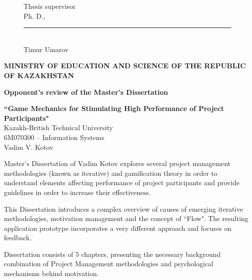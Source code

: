 \begin{titlepage}
        \begin{figure}[ht]
            \begin{minipage}[t]{0.5\linewidth}
                Thesis supervisor\\
                Ph. D.,

                \rule{13em}{0.4pt}\\
                Timur Umarov\\
            \end{minipage}
        \end{figure}
        
        \pagebreak

    \begin{centering}
        {\bf{\MakeUppercase{Ministry of education and science of the republic of Kazakhstan}}}

       \vspace{14pt}

        {\bf
        Opponent's review of the Master's Dissertation\\
        }

        \vspace{14pt}
        
        {\bf``Game Mechanics for Stimulating High Performance of Project Participants"}\\
        {\small Kazakh-British Technical University\\
        6M070300 -- Information Systems\\
        Vadim V. Kotov\\}
        
        \vspace{14pt}
        
    \end{centering}
    
    Master's Dissertation of Vadim Kotov explores several project management methodologies (known as iterative) and gamification theory in order to understand elements affecting performance of project participants and provide guidelines in order to increase their effectiveness.
    
    This Dissertation introduces a complex overview of causes of emerging iterative methodologies, motivation management and the concept of ``Flow". The resulting application prototype incorporates a very different approach and focuses on feedback.
    
    Dissertation consists of 5 chapters, presenting the necessary background combination of Project Management methodologies and psychological mechanisms behind motivation.
    

\end{titlepage}
